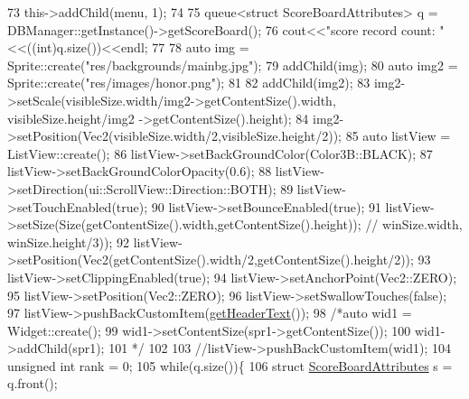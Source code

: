 \begin{DoxyCode}
73                     this->addChild(menu, 1);
74 
75                     queue<struct ScoreBoardAttributes> q = DBManager::getInstance()->getScoreBoard();
76                     cout<<\textcolor{stringliteral}{"score record count: "}<<((int)q.size())<<endl;
77                     
78                     \textcolor{keyword}{auto} img = Sprite::create(\textcolor{stringliteral}{"res/backgrounds/mainbg.jpg"});
79                     addChild(img);
80                     \textcolor{keyword}{auto} img2 = Sprite::create(\textcolor{stringliteral}{"res/images/honor.png"});
81                     
82                     addChild(img2);
83                     img2->setScale(visibleSize.width/img2->getContentSize().width, visibleSize.height/img2
      ->getContentSize().height);
84                     img2->setPosition(Vec2(visibleSize.width/2,visibleSize.height/2));
85                      \textcolor{keyword}{auto} listView = ListView::create();
86                     listView->setBackGroundColor(Color3B::BLACK);
87                     listView->setBackGroundColorOpacity(0.6);
88                     listView->setDirection(ui::ScrollView::Direction::BOTH);
89                     listView->setTouchEnabled(\textcolor{keyword}{true});
90                     listView->setBounceEnabled(\textcolor{keyword}{true});
91                     listView->setSize(Size(getContentSize().width,getContentSize().height)); \textcolor{comment}{//
      winSize.width, winSize.height/3));}
92                     listView->setPosition(Vec2(getContentSize().width/2,getContentSize().height/2));
93                     listView->setClippingEnabled(\textcolor{keyword}{true});
94                     listView->setAnchorPoint(Vec2::ZERO);
95                     listView->setPosition(Vec2::ZERO);
96                     listView->setSwallowTouches(\textcolor{keyword}{false});
97                     listView->pushBackCustomItem(\hyperlink{class_tetris_1_1_cocos2d_scenes_1_1_score_board_scene_a89a944c51155ffa16474e406a1103753}{getHeaderText}());
98                     \textcolor{comment}{/*auto wid1 = Widget::create();}
99 \textcolor{comment}{                    wid1->setContentSize(spr1->getContentSize());}
100 \textcolor{comment}{                    wid1->addChild(spr1);}
101 \textcolor{comment}{                    */}
102                    
103                     \textcolor{comment}{//listView->pushBackCustomItem(wid1);}
104                     \textcolor{keywordtype}{unsigned} \textcolor{keywordtype}{int} rank = 0;
105                     \textcolor{keywordflow}{while}(q.size())\{
106                         \textcolor{keyword}{struct }\hyperlink{struct_tetris_1_1_d_b_management_1_1_score_board_attributes}{ScoreBoardAttributes} s = q.front();

\end{DoxyCode}
